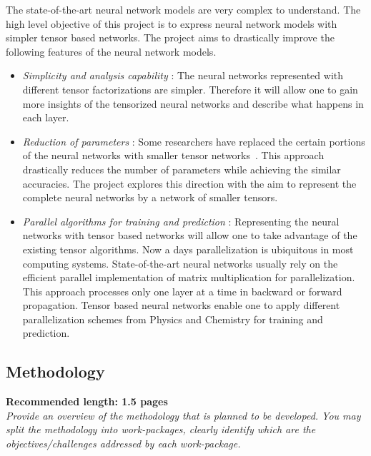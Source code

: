 The state-of-the-art neural network models are very complex to understand. The high level objective of this project is to express neural network models with simpler tensor based networks. 
The \prname project aims to drastically improve the following features of the neural network models.
\begin{itemize}
	\item \emph{Simplicity and analysis capability} : The neural networks represented with different tensor factorizations are simpler. Therefore it will allow one to gain more insights of the tensorized neural networks and describe what happens in each layer.
	\item \emph{Reduction of parameters} : Some researchers have replaced the certain portions of the neural networks with smaller tensor networks~\cite{bibid}. This approach drastically reduces the number of parameters while achieving the similar accuracies. The \prname project explores this direction with the aim to represent the complete neural networks by a network of smaller tensors. 
	\item \emph{Parallel algorithms for training and prediction} : Representing the neural networks with tensor based networks will allow one to take advantage of the existing tensor algorithms. Now a days parallelization is ubiquitous in most computing systems. State-of-the-art neural networks usually rely on the efficient parallel implementation of matrix multiplication for parallelization. This approach processes only one layer at a time in backward or forward propagation. Tensor based neural networks enable one to apply different parallelization schemes from Physics and Chemistry for training and prediction.
\end{itemize}


\subsection*{Methodology} 
\textbf{Recommended length: 1.5 pages}\\

\textit{Provide an overview of the methodology that is planned to be developed. You may split the methodology into work-packages, clearly identify which are the objectives/challenges addressed by each work-package.}


